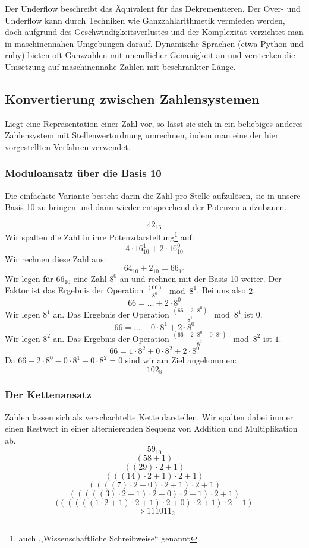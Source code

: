 Der Underflow beschreibt das Äquivalent für das Dekrementieren.
Der Over- und Underflow kann durch Techniken wie Ganzzahlarithmetik vermieden
werden, doch aufgrund des Geschwindigkeitsverlustes und der Komplexität
verzichtet man in maschinennahen Umgebungen darauf. Dynamische Sprachen
(etwa Python und ruby) bieten oft Ganzzahlen mit unendlicher Genauigkeit
an und verstecken die Umsetzung auf maschinennahe Zahlen mit beschränkter
Länge.
%
\subsection{Konvertierung zwischen Zahlensystemen}
%
Liegt eine Repräsentation einer Zahl vor, so lässt sie sich in ein beliebiges
anderes Zahlensystem mit Stellenwertordnung umrechnen, indem man eine der
hier vorgestellten Verfahren verwendet.
%
\subsubsection{Moduloansatz über die Basis 10}
%
Die einfachste Variante besteht darin die Zahl pro Stelle aufzulösen,
sie in unsere Basis 10 zu bringen und dann wieder entsprechend der Potenzen
aufzubauen.

\[ 42_{16} \]
%
Wir spalten die Zahl in ihre Potenzdarstellung\footnote{%
auch ,,Wissenschaftliche Schreibweise`` genannt} auf:
\[ 4\cdot 16_{10}^1 + 2\cdot 16_{10}^0 \]
%
Wir rechnen diese Zahl aus:
\[ 64_{10} + 2_{10} = 66_{10} \]
%
Wir legen für $66_{10}$ eine Zahl $8^0$ an und rechnen mit der Basis 10 weiter.
Der Faktor ist das Ergebnis der Operation $\frac{(66)}{8^0}\mod{8^1}$.
Bei uns also $2$.
\[ 66 = \ldots + 2\cdot 8^0 \]
%
Wir legen $8^1$ an. Das Ergebnis der Operation
$\frac{(66-2\cdot8^0)}{8^1}\mod{8^1}$ ist $0$.
\[ 66 = \ldots + 0\cdot 8^1 + 2\cdot 8^0 \]
%
Wir legen $8^2$ an. Das Ergebnis der Operation
$\frac{(66-2\cdot8^0-0\cdot8^1)}{8^2}\mod{8^2}$ ist $1$.
\[ 66 = 1\cdot8^2 + 0\cdot8^2 + 2\cdot8^0 \]
%
Da $66-2\cdot8^0-0\cdot8^1-0\cdot8^2 = 0$ sind wir am Ziel angekommen:
\[ 102_{8} \]

\subsubsection{Der Kettenansatz}
%
Zahlen lassen sich als verschachtelte Kette darstellen.
Wir spalten dabei immer einen Restwert in einer alternierenden
Sequenz von Addition und Multiplikation ab.
%
\[
  59_{10}
\] \[
  (58 + 1)
\] \[
  ((29)\cdot2 + 1)
\] \[
  (((14)\cdot2 + 1)\cdot2 + 1)
\] \[
  ((((7)\cdot2 + 0)\cdot2 + 1)\cdot2 + 1)
\] \[
  (((((3)\cdot2 + 1)\cdot2 + 0)\cdot2 + 1)\cdot2 + 1)
\] \[
  ((((((1\cdot2 + 1)\cdot2 + 1)\cdot2 + 0)\cdot2 + 1)\cdot2 + 1)
\] \[
  \Rightarrow 111011_2
\]

